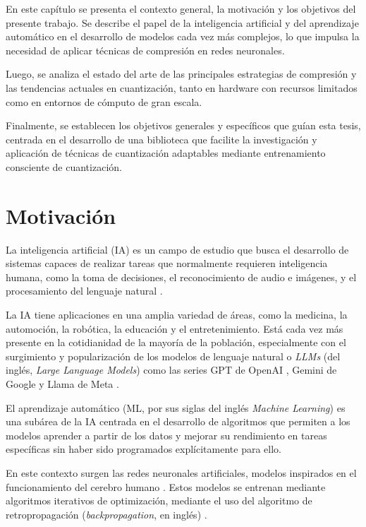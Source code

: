 En este capítulo se presenta el contexto general, la motivación y los objetivos del presente trabajo. Se describe el papel de la inteligencia artificial y del aprendizaje automático en el desarrollo de modelos cada vez más complejos, lo que impulsa la necesidad de aplicar técnicas de compresión en redes neuronales.

Luego, se analiza el estado del arte de las principales estrategias de compresión y las tendencias actuales en cuantización, tanto en hardware con recursos limitados como en entornos de cómputo de gran escala.

Finalmente, se establecen los objetivos generales y específicos que guían esta tesis, centrada en el desarrollo de una biblioteca que facilite la investigación y aplicación de técnicas de cuantización adaptables mediante entrenamiento consciente de cuantización.

\section{Motivación}
\label{sec:motivacion}

La inteligencia artificial (IA) es un campo de estudio que
busca el desarrollo de sistemas capaces de realizar tareas que normalmente requieren
inteligencia humana, como la toma de decisiones, el reconocimiento de audio e imágenes,
y el procesamiento del lenguaje natural \cite{russell2021ai}.

La IA tiene aplicaciones en una amplia variedad de áreas, como la medicina,
la automoción, la robótica, la educación y el entretenimiento.
Está cada vez más presente en la cotidianidad de la mayoría de la población,
especialmente con el surgimiento y popularización de los modelos de lenguaje natural
 o \textit{LLMs} \cite{IBM_LLM} (del inglés, \textit{Large Language Models})
 como las series GPT de OpenAI \cite{chatgpt}, Gemini de Google \cite{gemini} y Llama de Meta \cite{llama2}.

El aprendizaje automático (ML, por sus siglas del inglés \textit{Machine Learning})
es una subárea de la IA centrada en el desarrollo de algoritmos que permiten a los modelos aprender
a partir de los datos y mejorar su rendimiento en tareas específicas sin haber sido programados explícitamente para ello.

En este contexto surgen las redes neuronales artificiales, modelos
inspirados en el funcionamiento del cerebro humano \cite{Principe1997}. Estos modelos se entrenan mediante algoritmos iterativos
de optimización, mediante el uso del algoritmo de retropropagación (\textit{backpropagation}, en inglés) \cite{backpropagation}.


